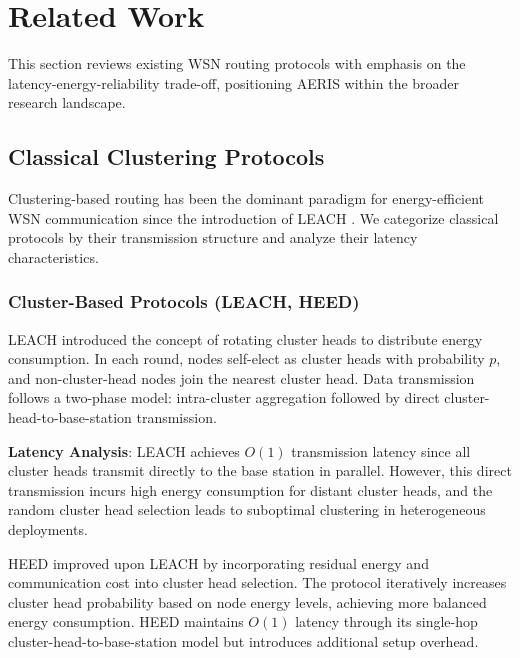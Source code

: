 
\section{Related Work}
\label{sec:related}

This section reviews existing WSN routing protocols with emphasis on the
latency-energy-reliability trade-off, positioning AERIS within the broader
research landscape.

\subsection{Classical Clustering Protocols}

Clustering-based routing has been the dominant paradigm for energy-efficient
WSN communication since the introduction of LEACH \cite{heinzelman2000leach}.
We categorize classical protocols by their transmission structure and analyze
their latency characteristics.

\subsubsection{Cluster-Based Protocols (LEACH, HEED)}

LEACH \cite{heinzelman2000leach} introduced the concept of rotating cluster
heads to distribute energy consumption. In each round, nodes self-elect as
cluster heads with probability $p$, and non-cluster-head nodes join the
nearest cluster head. Data transmission follows a two-phase model:
intra-cluster aggregation followed by direct cluster-head-to-base-station
transmission.

\textbf{Latency Analysis}: LEACH achieves $O(1)$ transmission latency since
all cluster heads transmit directly to the base station in parallel. However,
this direct transmission incurs high energy consumption for distant cluster
heads, and the random cluster head selection leads to suboptimal clustering
in heterogeneous deployments.

HEED \cite{younis2004heed} improved upon LEACH by incorporating residual
energy and communication cost into cluster head selection. The protocol
iteratively increases cluster head probability based on node energy levels,
achieving more balanced energy consumption. HEED maintains $O(1)$ latency
through its single-hop cluster-head-to-base-station model but introduces
additional setup overhead.

